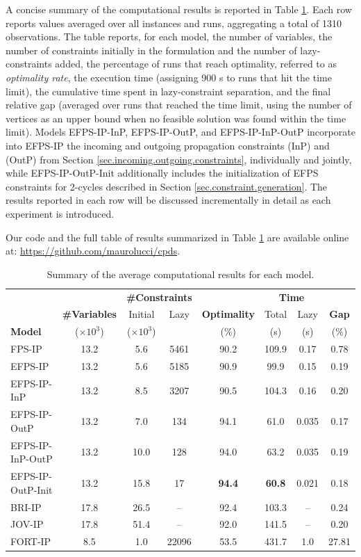 \documentclass{article}
\newcommand{\FPSIP}{FPS-IP\xspace}
\newcommand{\EFPSIP}{EFPS-IP\xspace}
\newcommand{\BRIIP}{BRI-IP\xspace}
\newcommand{\JOVIP}{JOV-IP\xspace}
\newcommand{\FORTIP}{FORT-IP\xspace}
\begin{document}
A concise summary of the computational results is reported in Table \ref{tab.summary}.
Each row reports values averaged over all instances and runs, aggregating a total of 1310 observations.
The table reports, for each model, the number of variables, the number of constraints initially in the formulation and the number of lazy-constraints added, the percentage of runs that reach optimality, referred to as \emph{optimality rate}, the execution time (assigning 900 s to runs that hit the time limit), the cumulative time spent in lazy-constraint separation, and the final relative gap (averaged over runs that reached the time limit, using the number of vertices as an upper bound when no feasible solution was found within the time limit).
Models \EFPSIP-InP, \EFPSIP-OutP, and \EFPSIP-InP-OutP incorporate into \EFPSIP the incoming and outgoing propagation constraints (InP) and (OutP) from Section \ref{sec.incoming.outgoing.constraints}, individually and jointly, while \EFPSIP-OutP-Init additionally includes the initialization of EFPS constraints for 2-cycles described in Section \ref{sec.constraint.generation}.
The results reported in each row will be discussed incrementally in detail as each experiment is introduced.

Our code and the full table of results summarized in Table \ref{tab.summary} are available online at: \url{https://github.com/maurolucci/cpds}.

\begin{table}[]
\centering \footnotesize
\renewcommand{\arraystretch}{1.1}
\setlength{\tabcolsep}{4pt}
\begin{tabular}{lccccccc}
\toprule
& & \multicolumn{2}{c}{\textbf{\#Constraints}} & & \multicolumn{2}{c}{\textbf{Time}} & \\
\cmidrule(l{2pt}r{2pt}){3-4} \cmidrule(l{2pt}r{2pt}){6-7}
& \textbf{\#Variables} & Initial & Lazy & \textbf{Optimality} & Total & Lazy & \textbf{Gap} \\
\textbf{Model} & ($\times 10^3$) & ($\times 10^3$) & & (\%) & (s) & (s) & (\%) \\
\midrule
\FPSIP & 13.2 & 5.6 & 5461 & 90.2 & 109.9 & 0.17 & 0.78 \\
\EFPSIP & 13.2 & 5.6 & 5185 & 90.9 & 99.9 & 0.15 & 0.19 \\
\EFPSIP-InP & 13.2 & 8.5 & 3207 & 90.5 & 104.3 & 0.16 & 0.20 \\
\EFPSIP-OutP & 13.2 & 7.0 & 134 & 94.1 & 61.0 & 0.035 & 0.17 \\
\EFPSIP-InP-OutP & 13.2 & 10.0 & 128 & 94.0 & 63.2 & 0.035 & 0.19 \\
\EFPSIP-OutP-Init & 13.2 & 15.8 & 17 & \textbf{94.4} & \textbf{60.8} & 0.021 & 0.18 \\
\midrule
\BRIIP & 17.8 & 26.5 & -- & 92.4 & 103.3 & -- & 0.24 \\
\JOVIP & 17.8 & 51.4 & -- & 92.0 & 141.5 & -- & 0.20 \\
\FORTIP & 8.5 & 1.0 & 22096 & 53.5 & 431.7 & 1.0 & 27.81 \\
\bottomrule
\end{tabular}
\caption{Summary of the average computational results for each model.}
\label{tab.summary}
\end{table}
\end{document}

